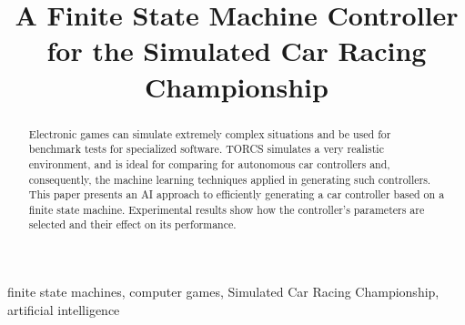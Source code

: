\documentclass[journal]{IEEEtran}%
\begin{document}
	\title{A Finite State Machine Controller for the Simulated Car Racing Championship}

\author{
	}


\maketitle

\begin{abstract}
Electronic games can simulate extremely complex situations and be used for benchmark tests for specialized software. 
TORCS simulates a very realistic environment, and is ideal for comparing for autonomous car controllers and, consequently, the machine learning techniques applied in generating such controllers. This paper presents an AI approach to efficiently generating a car controller based on a finite state machine. Experimental results show how the controller's parameters are selected and their effect on its performance.
\end{abstract}

\begin{IEEEkeywords}
finite state machines, computer games, Simulated Car Racing Championship, artificial intelligence
\end{IEEEkeywords}%

%
%
%
%
%

%
%
\end{document}

